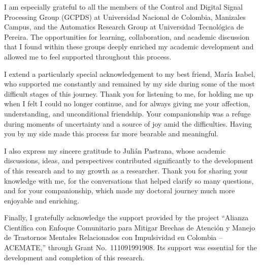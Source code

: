 I am especially grateful to all the members of the Control and Digital Signal Processing Group (GCPDS) at Universidad Nacional de Colombia, Manizales Campus, and the Automatics Research Group at Universidad Tecnológica de Pereira. The opportunities for learning, collaboration, and academic discussion that I found within these groups deeply enriched my academic development and allowed me to feel supported throughout this process.

I extend a particularly special acknowledgement to my best friend, María Isabel, who supported me constantly and remained by my side during some of the most difficult stages of this journey. Thank you for listening to me, for holding me up when I felt I could no longer continue, and for always giving me your affection, understanding, and unconditional friendship. Your companionship was a refuge during moments of uncertainty and a source of joy amid the difficulties. Having you by my side made this process far more bearable and meaningful.

I also express my sincere gratitude to Julián Pastrana, whose academic discussions, ideas, and perspectives contributed significantly to the development of this research and to my growth as a researcher. Thank you for sharing your knowledge with me, for the conversations that helped clarify so many questions, and for your companionship, which made my doctoral journey much more enjoyable and enriching.

Finally, I gratefully acknowledge the support provided by the project ``Alianza Científica con Enfoque Comunitario para Mitigar Brechas de Atención y Manejo de Trastornos Mentales Relacionados con Impulsividad en Colombia -- ACEMATE,'' through Grant No.~111091991908. Its support was essential for the development and completion of this research.
